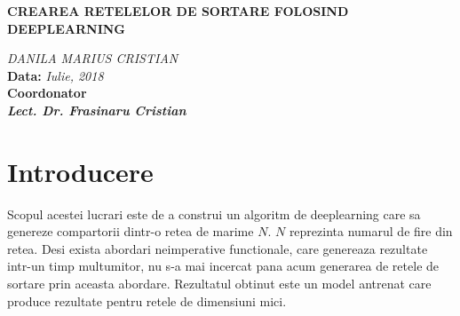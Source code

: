 \documentclass[12pt]{article}
\begin{document}
\begin{titlepage}
\begin{center}
	\vspace{10mm}
	
	\large \textbf{CREAREA RETELELOR DE SORTARE FOLOSIND DEEPLEARNING}\\
	\vspace{5mm}
		
	\vspace{5mm}
	\large\textit {DANILA MARIUS CRISTIAN}
	\\
	\vspace{20mm}
	\textbf{Data: }\textit{Iulie, 2018}\\
	\vspace{10mm}
	\textbf{Coordonator}\\
	\textbf{\textit{Lect. Dr. Frasinaru Cristian}}
	\vspace{30mm}
	\pagebreak
\end{center}
\end{titlepage} 



\renewcommand{\refname}{Bibliografie}  %
\renewcommand{\contentsname}{Cuprins}
\renewcommand{\figurename}{Fig.}
\newcommand{\code}[1]{\colorbox{light-gray}{\texttt{#1}}}



\tableofcontents


\vspace{80mm}

\pagebreak

\section{Introducere}
Scopul acestei lucrari este de a construi un algoritm de deeplearning care sa genereze compartorii dintr-o retea de marime $N$. $N$ reprezinta numarul de fire din retea.
Desi exista abordari neimperative functionale, care genereaza rezultate intr-un timp multumitor, nu s-a mai incercat pana acum generarea de retele de sortare prin aceasta abordare. Rezultatul obtinut este un model antrenat care produce rezultate pentru retele de dimensiuni mici.
\end{document}

